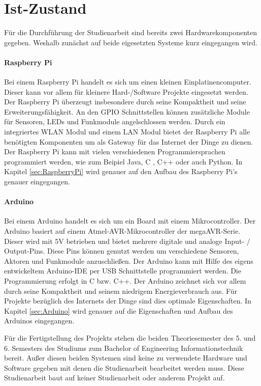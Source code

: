 \section{Ist-Zustand}
\label{sec:IstZustand}
Für die Durchführung der Studienarbeit sind bereits zwei Hardwarekomponenten gegeben. Weshalb zunächst auf beide eigesetzten Systeme kurz eingegangen wird.
\paragraph{Raspberry Pi} 
Bei einem Raspberry Pi handelt es sich um einen kleinen Einplatinencomputer. Dieser kann vor allem für kleinere Hard-/Software Projekte eingesetzt werden. Der Raspberry Pi überzeugt insbesondere durch seine Kompaktheit und seine Erweiterungsfähigkeit. An den \ac{GPIO} Schnittstellen können zusätzliche Module für Sensoren, LEDs und Funkmodule angelschlossen werden.  Durch ein integriertes WLAN Modul und einem LAN Modul bietet der Raspberry Pi alle benötigten Komponenten um als Gateway für das Internet der Dinge zu dienen. Der Raspberry Pi kann mit vielen verschiedenen Programmiersprachen programmiert werden, wie zum Beipiel Java, C , C++ oder auch Python. In Kapitel \ref{sec:RaspberryPi} wird genauer auf den Aufbau des Raspberry Pi’s genauer eingegangen.  
\paragraph{Arduino} 
Bei einem Arduino handelt es sich um ein Board mit einem Mikrocontroller. Der Arduino basiert auf einem Atmel-AVR-Mikrocontroller der megaAVR-Serie. Dieser wird mit 5V betrieben und bietet mehrere digitale und analoge Input- / Output-Pins.  Diese Pins können genutzt werden um verschiedene Sensoren, Aktoren und Funkmodule anzuschließen. Der Arduino kann mit Hilfe des eigens entwickeltem Arduino-IDE per USB Schnittstelle programmiert werden. Die Programmierung erfolgt in C bzw. C++. Der Arduino zeichnet sich vor allem durch seine Kompaktheit und seinem niedrigem Energieverbrauch aus. Für Projekte bezüglich des Internets der Dinge sind dies optimale  Eigenschaften.   In Kapitel \ref{sec:Arduino} wird genauer auf die Eigenschaften und Aufbau des Arduinos eingegangen.

Für die Fertigstellung des Projekts stehen die beiden Theoriesemester des 5. und 6. Semesters des Studiums zum Bachelor of Engineering Informationstechnik bereit. Außer diesen beiden Systemen sind keine zu verwendete Hardware und Software gegeben mit denen die Studienarbeit bearbeitet werden muss. Diese Studienarbeit baut auf keiner Studienarbeit oder anderem Projekt auf.

